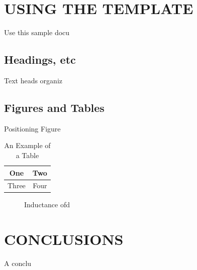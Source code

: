 \documentclass[letterpaper, 10 pt, conference]{ieeeconf}  %
\begin{document}
\section{USING THE TEMPLATE}

Use this sample docu

\subsection{Headings, etc}

Text heads organiz

\subsection{Figures and Tables}

Positioning Figure



\begin{table}[h]
\caption{An Example of a Table}
\label{table_example}
\begin{center}
\begin{tabular}{|c||c|}
\hline
One & Two\\
\hline
Three & Four\\
\hline
\end{tabular}
\end{center}
\end{table}


   \begin{figure}[thpb]
      \centering
      \caption{Inductance ofd}
      \label{figurelabel}
   \end{figure}




\section{CONCLUSIONS}

A conclu

\addtolength{\textheight}{-12cm}   %
\end{document}
